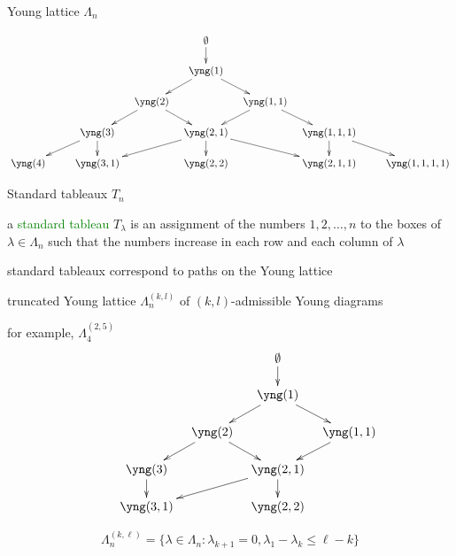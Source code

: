 \documentclass{prosper}
\renewcommand{\>}{\rangle}
\newcommand{\<}{\langle}
\begin{document}
\begin{slide}{Young lattice $\Lambda_n$}

\begin{tiny}
\[\xymatrix@R=.5cm@C=.3cm{
& & & & \emptyset \ar[d]\\
& & & & {\yng(1)} \ar[dr] \ar[dl]\\
& & & {\yng(2)}\ar[dl]\ar[dr] & &  {\yng(1,1)}\ar[dl]\ar[dr] \\
& & {\yng(3)}\ar[dll]\ar[d] & & {\yng(2,1)}\ar[dll]\ar[d]\ar[drr] & & {\yng(1,1,1)}\ar[d]\ar[drr] \\
{\yng(4)} & & {\yng(3,1)} & & {\yng(2,2)} & &  {\yng(2,1,1)} & & {\yng(1,1,1,1)}
}\]
\end{tiny}
\label{younggraph}

\end{slide}


\begin{slide}{Standard tableaux $T_n$} 

a \textcolor{green}{standard tableau} $T_\lambda$ is an assignment of
the numbers $1,2,\ldots,n$ to the boxes of $\lambda\in\Lambda_n$ such
that the numbers increase in each row and each column of $\lambda$

\bigskip
standard tableaux correspond to paths on the Young lattice
\end{slide}


\begin{slide}{truncated Young lattice $\Lambda_n^{(k,l)}$}
of $(k,l)$-admissible Young diagrams

\vspace{1.5cm}for example, $\Lambda_4^{(2,5)}$\quad\vspace{-3cm}
{\tiny
\[
\xymatrix@R=.5cm@C=.3cm{
& & & & \emptyset \ar[d]\\
& & & & {\yng(1)} \ar[dr] \ar[dl]\\
& & & {\yng(2)} \ar[dr] \ar[dl]& &  {\yng(1,1)}\ar[dl] \\
& & {\yng(3)} \ar[d]& & {\yng(2,1)}\ar[d]\ar[dll]  \\
& & {\yng(3,1)}  & & {\yng(2,2)}
}
\]
}

\[
\Lambda_n^{(k,\ell)} = \{\lambda\in \Lambda_n : 
\lambda_{k+1} = 0, \lambda_1 - \lambda_k\leq \ell-k\}
\]
\end{slide}
\end{document}
